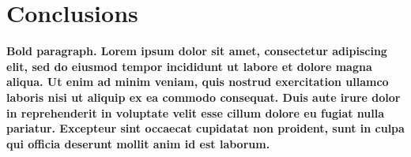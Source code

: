 \documentclass{llncs}
\begin{document}
 
 \section{Conclusions}
 
 \textbf{Bold paragraph. Lorem ipsum dolor sit amet, consectetur adipiscing elit, sed do eiusmod tempor incididunt ut labore et dolore magna aliqua. Ut enim ad minim veniam, quis nostrud exercitation ullamco laboris nisi ut aliquip ex ea commodo consequat. Duis aute irure dolor in reprehenderit in voluptate velit esse cillum dolore eu fugiat nulla pariatur. Excepteur sint occaecat cupidatat non proident, sunt in culpa qui officia deserunt mollit anim id est laborum.}

\end{document}
